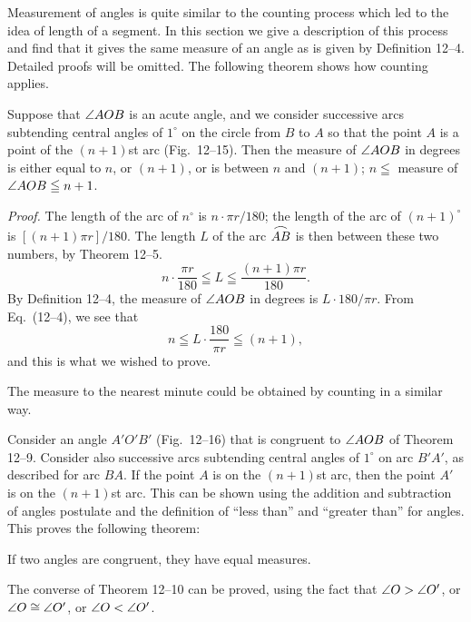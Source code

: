 \documentclass[11pt]{book}
\newcommand{\XIIarc}[1]{\overset{\raisebox{-0.25ex}{\scalebox{1.15}[0.85]{$\frown$}}}{#1}}
\begin{document}
Measurement of angles is quite similar to the counting process which led to the
idea of length of a segment. In this section we give a description of this
process and find that it gives the same measure of an angle as is given by
Definition 12--4. Detailed proofs will be omitted. The following theorem shows
how counting applies.

\begin{theorem}
Suppose that $\angle AOB$ is an acute angle, and we consider successive arcs
subtending central angles of $1^\circ$ on the circle from $B$ to $A$ so that the
point $A$ is a point of the $(n + 1)$st arc (Fig.~12--15). Then the measure of
$\angle AOB$ in degrees is either equal to $n$, or $(n + 1)$, or is between $n$
and $(n + 1)$; $n \leqq$ measure of $\angle AOB \leqq n + 1$.
\end{theorem}

\FIGXIIFIFTEEN

\noindent\emph{Proof.} The length of the arc of $n^\circ$ is
$n \cdot \pi r/180$; the length of the arc of $(n + 1)^\circ$ is
$[(n + 1)\pi r]/180$. The length $L$ of the arc $\XIIarc{AB}$ is then between
these two numbers, by Theorem 12--5.
\begin{equation}
n \cdot \frac{\pi r}{180} \leqq L \leqq \frac{(n + 1)\pi r}{180}.
\end{equation}
By Definition 12--4, the measure of $\angle AOB$ in degrees is
$L \cdot 180/\pi r$. From Eq.~(12--4), we see that
\[
n \leqq L \cdot \frac{180}{\pi r} \leqq (n + 1),
\]
and this is what we wished to prove.

\begin{remark}
The measure to the nearest minute could be obtained by counting in a similar
way.
\end{remark}

Consider an angle $A'O'B'$ (Fig.~12--16) that is congruent to $\angle AOB$ of
Theorem 12--9. Consider also successive arcs subtending central angles of
$1^\circ$ on arc $B'A'$, as described for arc $BA$. If the point $A$ is on the
$(n + 1)$st arc, then the point $A'$ is on the $(n + 1)$st arc. This can be
shown using the addition and subtraction of angles postulate and the definition
of ``less than'' and ``greater than'' for angles. This proves the following
theorem:

\begin{theorem}
If two angles are congruent, they have equal measures.
\end{theorem}

The converse of Theorem 12--10 can be proved, using the fact that
$\angle O > \angle O'$, or $\angle O \cong \angle O'$, or $\angle O < \angle O'$.
\end{document}
